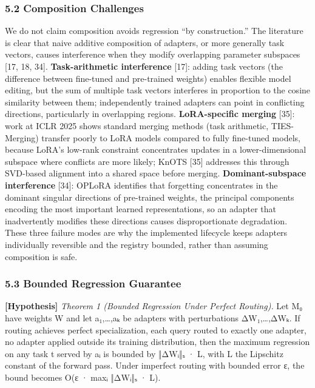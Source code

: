 \subsubsection{5.2 Composition Challenges}\label{composition-challenges}

We do not claim composition avoids regression ``by construction.'' The
literature is clear that naive additive composition of adapters, or more
generally task vectors, causes interference when they modify overlapping
parameter subspaces {[}17, 18, 34{]}. \textbf{Task-arithmetic
interference} {[}17{]}: adding task vectors (the difference between
fine-tuned and pre-trained weights) enables flexible model editing, but
the sum of multiple task vectors interferes in proportion to the cosine
similarity between them; independently trained adapters can point in
conflicting directions, particularly in overlapping regions.
\textbf{LoRA-specific merging} {[}35{]}: work at ICLR 2025 shows
standard merging methods (task arithmetic, TIES-Merging) transfer poorly
to LoRA models compared to fully fine-tuned models, because LoRA's
low-rank constraint concentrates updates in a lower-dimensional subspace
where conflicts are more likely; KnOTS {[}35{]} addresses this through
SVD-based alignment into a shared space before merging.
\textbf{Dominant-subspace interference} {[}34{]}: OPLoRA identifies that
forgetting concentrates in the dominant singular directions of
pre-trained weights, the principal components encoding the most
important learned representations, so an adapter that inadvertently
modifies these directions causes disproportionate degradation. These
three failure modes are why the implemented lifecycle keeps adapters
individually reversible and the registry bounded, rather than assuming
composition is safe.

\subsubsection{5.3 Bounded Regression
Guarantee}\label{bounded-regression-guarantee}

\textbf{{[}Hypothesis{]}} \emph{Theorem 1 (Bounded Regression Under
Perfect Routing).} Let M₀ have weights W and let a₁,\ldots,aₖ be
adapters with perturbations ΔW₁,\ldots,ΔWₖ. If routing achieves perfect
specialization, each query routed to exactly one adapter, no adapter
applied outside its training distribution, then the maximum regression
on any task t served by aᵢ is bounded by ‖ΔWᵢ‖ₛ · L, with L the
Lipschitz constant of the forward pass. Under imperfect routing with
bounded error ε, the bound becomes O(ε · maxᵢ ‖ΔWᵢ‖ₛ · L).


